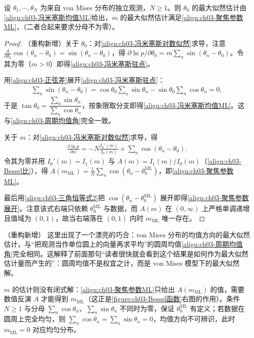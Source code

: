 \documentclass[../../main.tex]{subfiles}
\begin{document}
\begin{proposition}\label{proposition:ch03-冯米塞斯最大似然}
设 $\theta_1,\cdots,\theta_N$ 为来自 von Mises 分布的独立观测，$N\geqslant1$。则 $\theta_0$ 的最大似然估计由\eqref{align:ch03-冯米塞斯均值ML}给出，$m$ 的最大似然估计满足\eqref{align:ch03-聚焦参数ML}，（二者合起来要求分母不为零）。
\end{proposition}
\begin{proof}
（重构新增）关于 $\theta_0$：对\eqref{align:ch03-冯米塞斯对数似然}求导，注意 $\frac{\mathrm{d}}{\mathrm{d}\theta_0}\cos(\theta_n-\theta_0)=\sin(\theta_n-\theta_0)$，得 $\partial\ln p/\partial\theta_0=m\sum_n\sin(\theta_n-\theta_0)$。令其为零（$m>0$）即得\eqref{align:ch03-冯米塞斯驻点}。

用\eqref{align:ch03-正弦差}展开\eqref{align:ch03-冯米塞斯驻点}：
\begin{align*}
\sum_n\sin(\theta_n-\theta_0)=\cos\theta_0\sum_n\sin\theta_n-\sin\theta_0\sum_n\cos\theta_n=0,
\end{align*}
于是 $\tan\theta_0=\dfrac{\sum_n\sin\theta_n}{\sum_n\cos\theta_n}$，按象限取分支即得\eqref{align:ch03-冯米塞斯均值ML}。这与\eqref{align:ch03-周期均值角}完全一致。

关于 $m$：对\eqref{align:ch03-冯米塞斯对数似然}求导，得
\begin{align*}
\frac{\partial\ln p}{\partial m}=-N\frac{I_0'(m)}{I_0(m)}+\sum_n\cos(\theta_n-\theta_0).
\end{align*}
令其为零并用 $I_0'(m)=I_1(m)$ 与 $A(m)=I_1(m)/I_0(m)$（\eqref{align:ch03-Bessel比}），得 $A(m_{\mathrm{ML}})=\frac1N\sum_n\cos(\theta_n-\theta_0^{\mathrm{ML}})$，即\eqref{align:ch03-聚焦参数ML}。

最后用\eqref{align:ch03-三角恒等式2}把 $\cos(\theta_n-\theta_0^{\mathrm{ML}})$ 展开即得\eqref{align:ch03-聚焦参数展开}。注意该式右端只依赖 $\theta_0^{\mathrm{ML}}$ 与数据，而 $A(m)$ 在 $(0,\infty)$ 上严格单调递增且值域为 $(0,1)$，故当右端落在 $(0,1)$ 内时 $m_{\mathrm{ML}}$ 唯一存在。
\end{proof}

\begin{remark}（重构新增）
这里出现了一个漂亮的巧合：von Mises 分布的均值方向的最大似然估计，与“把观测当作单位圆上的向量再求平均”的圆周均值\eqref{align:ch03-周期均值角}完全相同。这解释了前面那句“读者很快就会看到这个结果是如何作为最大似然估计量而产生的”：圆周均值不是权宜之计，而是 von Mises 模型下的最大似然解。

$m$ 的估计则没有闭式解：\eqref{align:ch03-聚焦参数ML}只给出 $A(m_{\mathrm{ML}})$ 的值，需要数值反演 $A$ 才能得到 $m_{\mathrm{ML}}$（这正是\cref{figure:ch03-Bessel函数}右图的作用）。条件 $N\geqslant1$ 与分母 $\sum_n\cos\theta_n$、$\sum_n\sin\theta_n$ 不同时为零，保证 $\theta_0^{\mathrm{ML}}$ 有定义；若数据在圆周上完全均匀，则 $\sum_n\cos\theta_n=\sum_n\sin\theta_n=0$，均值方向不可辨识，此时 $m_{\mathrm{ML}}=0$ 对应均匀分布。
\end{remark}
\end{document}
